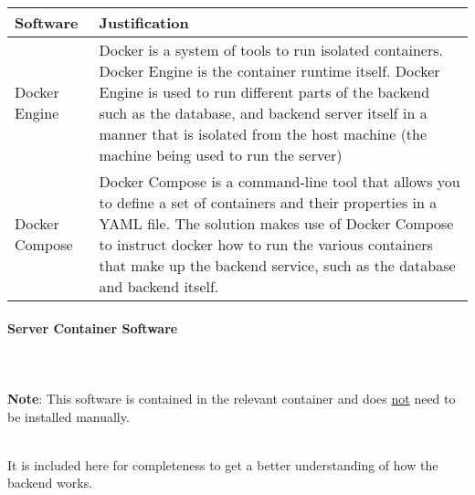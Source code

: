 \documentclass[../../../main.tex]{subfiles}
\begin{document}
\begin{tabular}{ |p{}|p{}| }
    \hline
    \textbf{Software} & \textbf{Justification}                                                                                                                                                                \\
    \hline
    Docker Engine     & Docker is a system of tools to run isolated containers.\newline
    Docker Engine is the container runtime itself.\newline
    Docker Engine is used to run different parts of the backend such as the database, and backend server itself in a manner that is isolated from the host machine (the machine being used to run the server) \\
    \hline
    Docker Compose    & Docker Compose is a command-line tool that allows you to define a set of containers and their properties in a YAML file.\newline
    The solution makes use of Docker Compose to instruct docker how to run the various containers that make up the backend service, such as the database and backend itself.                                  \\
    \hline
\end{tabular}

\pagebreak

\paragraph{Server Container Software}

\noindent \\\\ \textbf{Note}: This software is contained in the relevant container and does \underline{not} need to be installed manually.

\noindent \\ It is included here for completeness to get a better understanding of how the backend works.\\
\end{document}
